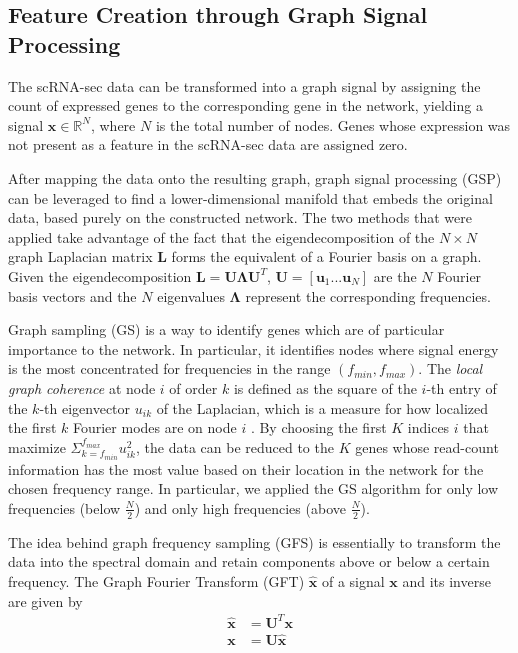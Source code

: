 \documentclass[10pt,conference,compsocconf]{IEEEtran}
\begin{document}
\subsection{Feature Creation through Graph Signal Processing}
The scRNA-sec data can be transformed into a graph signal by assigning the count of expressed genes to the corresponding gene in the network, yielding a signal $\boldsymbol{x} \in \mathbb{R}^N$, where $N$ is the total number of nodes. Genes whose expression was not present as a feature in the scRNA-sec data are assigned zero. 
\par
After mapping the data onto the resulting graph, graph signal processing (GSP) can be leveraged to find a lower-dimensional manifold that embeds the original data, based purely on the constructed network. The two methods that were applied take advantage of the fact that the eigendecomposition of the $N \times N$ graph Laplacian matrix $\boldsymbol{L}$ forms the equivalent of a Fourier basis on a graph. Given the eigendecomposition $\boldsymbol{L} = \boldsymbol{U\Lambda U}^T$, $\boldsymbol{U} = [ \boldsymbol{u}_1 ... \boldsymbol{u}_N]$ are the $N$ Fourier basis vectors and the $N$ eigenvalues $\boldsymbol{\Lambda}$ represent the corresponding frequencies.
\par
Graph sampling (GS) is a way to identify genes which are of particular importance to the network. In particular, it identifies nodes where signal energy is the most concentrated for frequencies in the range $(f_{min}, f_{max})$. The \textit{local graph coherence} at node $i$ of order $k$ is defined as the square of the $i$-th entry of the $k$-th eigenvector $u_{ik}$ of the Laplacian, which is a measure for how localized the first $k$ Fourier modes are on node $i$ \cite{Puy2018}. By choosing the first $K$ indices $i$ that maximize $\Sigma_{k=f_{min}}^{f_{max}} u_{ik}^2$, the data can be reduced to the $K$ genes whose read-count information has the most value based on their location in the network for the chosen frequency range. In particular, we applied the GS algorithm for only low frequencies (below $\frac{N}{2}$) and only high frequencies (above $\frac{N}{2}$). 
\par
The idea behind graph frequency sampling (GFS) is essentially to transform the data into the spectral domain and retain components above or below a certain frequency. The Graph Fourier Transform (GFT) $\boldsymbol{\hat{x}}$ of a signal $\boldsymbol{x}$ and its inverse are given by
\begin{align}\label{equ:GFT}
\boldsymbol{\hat{x}} &= \boldsymbol{U}^T \boldsymbol{x}\\ \label{equ:iGFT}
\boldsymbol{x} &= \boldsymbol{U} \boldsymbol{\hat{x}}
\end{align} 
\end{document}
